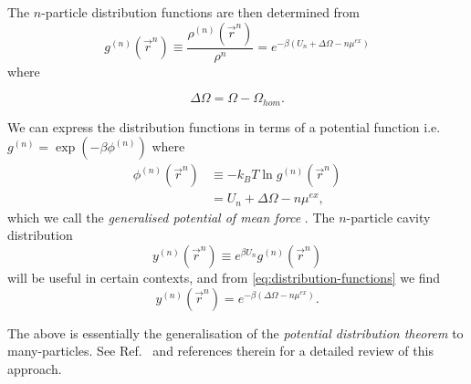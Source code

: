 \documentclass[11pt]{report}
\begin{document}
The $n$-particle distribution functions are then determined from~\cite{Hansen2013}
\begin{subequations}\label{eq:distribution-functions}
  \begin{equation}
    g^{(n)}(\vec{r}^n)
    \equiv \frac{\rho^{(n)}(\vec{r}^n)}{\rho^n}
    = e^{-\beta(U_n + \Delta\Omega - n\mu^{ex})}
  \end{equation}
\end{subequations}
where
\begin{subequations*}
  \begin{equation}
    \Delta\Omega = \Omega - \Omega_{hom}.
  \end{equation}
\end{subequations*}
We can express the distribution functions in terms of a potential function i.e.\ $g^{(n)} = \exp{\left(-\beta \phi^{(n)}\right)}$ where
\begin{equation}\label{eq:potential-mean-force}
  \begin{split}
    \phi^{(n)}(\vec{r}^n) &\equiv
    - k_B T \ln{g^{(n)}(\vec{r}^n)} \\
    &=
    U_n + \Delta\Omega - n\mu^{ex},
  \end{split}
\end{equation}
which we call the \emph{generalised potential of mean force}%
.
The $n$-particle cavity distribution \[y^{(n)}(\vec{r}^n) \equiv e^{\beta U_n} g^{(n)}(\vec{r}^n)\] will be useful in certain contexts, and from \eqref{eq:distribution-functions} we find
\begin{equation}\label{eq:cavity-functions}
  y^{(n)}(\vec{r}^n) =
  e^{-\beta(\Delta\Omega - n\mu^{ex})}.
\end{equation}

The above is essentially the generalisation of the \emph{potential distribution theorem} \cite{Widom1963,Widom1982} to many-particles. See Ref.\ \cite{Rowlinson2002} and references therein for a detailed review of this approach.
\end{document}
